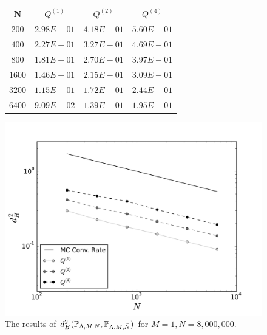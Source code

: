 
\begin{figure}[h]
\begin{minipage}{.5\textwidth}
\begin{table}[H]
\begin{tabular}{ c | c | c | c }
N & $Q^{(1)}$ & $Q^{(2)}$ & $Q^{(4)}$\\ \hline \hline
$200$ & $2.98E-01$ & $4.18E-01$ & $5.60E-01$\\ \hline 
 
$400$ & $2.27E-01$ & $3.27E-01$ & $4.69E-01$\\ \hline 
 
$800$ & $1.81E-01$ & $2.70E-01$ & $3.97E-01$\\ \hline 
 
$1600$ & $1.46E-01$ & $2.15E-01$ & $3.09E-01$\\ \hline 
 
$3200$ & $1.15E-01$ & $1.72E-01$ & $2.44E-01$\\ \hline 
 
$6400$ & $9.09E-02$ & $1.39E-01$ & $1.95E-01$\\ \hline
\end{tabular}
\end{table}
\end{minipage}
\begin{minipage}{.45\textwidth}
		\includegraphics[width=\linewidth]{./images/Plot-reg_BigN_8000000_reg_M_1_rand_I_100000}
\end{minipage}
\caption{The results of $d^2_H(\mathbb{P}_{{\Lambda}, M, N}, \mathbb{P}_{{\Lambda}, M, \bar{N}})$ for $M = 1, \bar{N} = 8,000,000$.}
\label{fig:M1_3d}
\end{figure}
